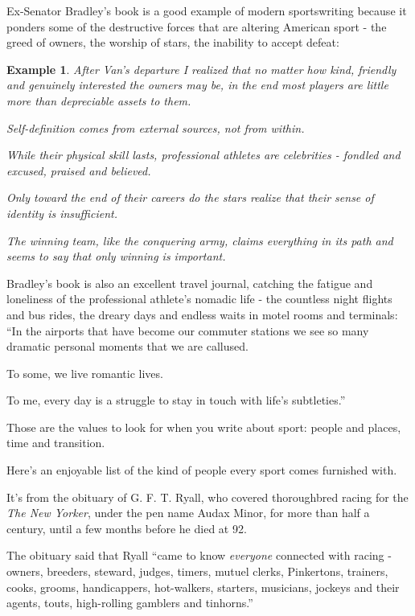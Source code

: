 \documentclass{book}
\numberwithin{equation}{section}
\newtheorem{example}{Example}[chapter]
\begin{document}
Ex-Senator Bradley's book is a good example of modern sportswriting because it ponders some of the destructive forces that are altering American sport - the greed of owners, the worship of stars, the inability to accept defeat:
\begin{example}
    After Van's departure I realized that no matter how kind, friendly and genuinely interested the owners may be, in the end most players are little more than depreciable assets to them.
    
    Self-definition comes from external sources, not from within.
    
    While their physical skill lasts, professional athletes are celebrities - fondled and excused, praised and believed.
    
    Only toward the end of their careers do the stars realize that their sense of identity is insufficient.
    
    The winning team, like the conquering army, claims everything in its path and seems to say that only winning is important.
    
    
\end{example}
Bradley's book is also an excellent travel journal, catching the fatigue and loneliness of the professional athlete's nomadic life - the countless night flights and bus rides, the dreary days and endless waits in motel rooms and terminals: ``In the airports that have become our commuter stations we see so many dramatic personal moments that we are callused.

To some, we live romantic lives.

To me, every day is a struggle to stay in touch with life's subtleties.''

Those are the values to look for when you write about sport: people and places, time and transition.

Here's an enjoyable list of the kind of people every sport comes furnished with.

It's from the obituary of G. F. T. Ryall, who covered thoroughbred racing for the \textit{The New Yorker}, under the pen name Audax Minor, for more than half a century, until a few months before he died at 92.

The obituary said that Ryall ``came to know \textit{everyone} connected with racing - owners, breeders, steward, judges, timers, mutuel clerks, Pinkertons, trainers, cooks, grooms, handicappers, hot-walkers, starters, musicians, jockeys and their agents, touts, high-rolling gamblers and tinhorns.''
\end{document}
